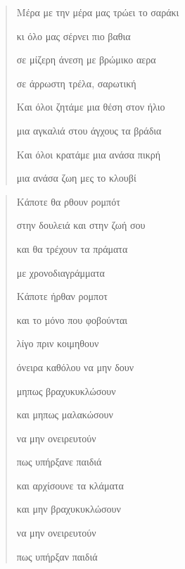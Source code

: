 \documentclass[12pt]{article}
\begin{document}
\begin{verse}
  Μέρα με την μέρα μας τρώει το σαράκι

  κι όλο μας σέρνει πιο βαθια

  σε μίζερη άνεση με βρώμικο αερα

  σε άρρωστη τρέλα, σαρωτική

  Και όλοι ζητάμε μια θέση στον ήλιο

  μια αγκαλιά στου άγχους τα βράδια

  Και όλοι κρατάμε μια ανάσα πικρή

  μια ανάσα ζωη μες το κλουβί
\end{verse}

\begin{verse}
\end{verse}

\begin{verse}
  Κάποτε θα ρθουν ρομπότ

  στην δουλειά και στην ζωή σου

  και θα τρέχουν τα πράματα

  με χρονοδιαγράμματα

  Κάποτε ήρθαν ρομποτ

  και το μόνο που φοβούνται

  λίγο πριν κοιμηθουν

  όνειρα καθόλου να μην δουν

  μηπως βραχυκυκλώσουν

  και μηπως μαλακώσουν

  να μην ονειρευτούν

  πως υπήρξανε παιδιά

  και αρχίσουνε τα κλάματα

  και μην βραχυκυκλώσουν

  να μην ονειρευτούν

  πως υπήρξαν παιδιά
\end{verse}
\end{document}
